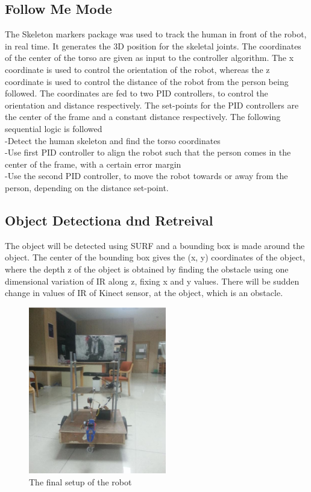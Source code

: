 \documentclass[conference]{IEEEtran}
\begin{document}
\subsection{Follow Me Mode}
The Skeleton markers package was used to track the human in front of the robot, in real time. It generates the 3D position for the skeletal joints. The coordinates of the center of the torso are given as input to the controller algorithm. The x coordinate is used to control the orientation of the robot, whereas the z coordinate is used to control the distance of the robot from the person being followed. The coordinates are fed to two PID controllers, to control the orientation and distance respectively. The set-points for the PID controllers are the center of the frame and a constant distance respectively. The following sequential logic is followed\\
-Detect the human skeleton and find the torso coordinates\\
-Use first PID controller to align the robot such that the person comes in the center of the frame, with a certain error margin\\
-Use the second PID controller, to move the robot towards or away from the person, depending on the distance set-point.\\
\subsection{Object Detectiona dnd Retreival}
 The object will be detected using SURF and a bounding box is made around the object. The center of the bounding box gives the (x, y) coordinates of the object, where the depth z of the object is obtained by finding the obstacle using one dimensional variation of IR along z, fixing x and y values. There will be sudden change in values of IR of Kinect sensor, at the object, which is an obstacle.
\begin{figure}[h]
\includegraphics[width=6cm]{robotsetup.png}
\centering
\caption{The final setup of the robot}\label{net_img}
\end{figure}
\end{document}
